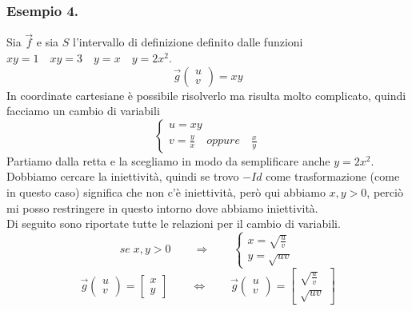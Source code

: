 \documentclass[10pt]{article}
\theoremstyle{plain}
\theoremstyle{definition}
\begin{document}

\subsubsection{Esempio 4.}
Sia $\vec{f}$ e sia $S$ l'intervallo di definizione definito dalle funzioni \\
$xy=1 \quad xy=3 \quad y=x \quad y=2x^2$.
$$\vec{g} \left( \begin{matrix} u \\ v \end{matrix}\right) = xy$$
In coordinate cartesiane è possibile risolverlo ma risulta molto complicato, quindi facciamo un cambio di variabili\\
$$\begin{cases}
 u = xy \\ v=\frac{y}{x} \quad oppure \quad \frac{x}{y}
\end{cases}$$
Partiamo dalla retta e la scegliamo in modo da semplificare anche $y=2x^2$.\\
Dobbiamo cercare la iniettività, quindi se trovo $-Id$ come trasformazione (come in questo caso) significa che non c'è iniettività, però qui abbiamo $x,y>0$, perciò mi posso restringere in questo intorno dove abbiamo iniettività. \\
Di seguito sono riportate tutte le relazioni per il cambio di variabili.
$$
se \; x,y>0 \qquad \Rightarrow \qquad
\begin{cases}
 x=\sqrt{\frac{u}{v}} \\ y=\sqrt{uv}
\end{cases}
$$
$$
\vec{g} \left( \begin{matrix} u \\ v \end{matrix}\right) = \begin{bmatrix} x\\ y \end{bmatrix} \qquad \Leftrightarrow \qquad \vec{g} \left( \begin{matrix} u \\ v \end{matrix}\right) = \begin{bmatrix} \sqrt{\frac{u}{v}}\\ \sqrt{uv} \end{bmatrix} $$
\end{document}
